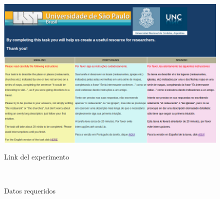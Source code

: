 \begin{figure}[ht]
\begin{center}
\includegraphics[width=13cm]{images/pagPrincipal.png}\\[0pt]
\caption{Link del experimento}
\label{fig-pagPrincipal}
\end{center}
\end{figure}

\begin{figure}[ht]
\begin{center}
\\[0pt]
\caption{Datos requeridos}
\label{fig-nacionalidadGenero}
\end{center}
\end{figure}

